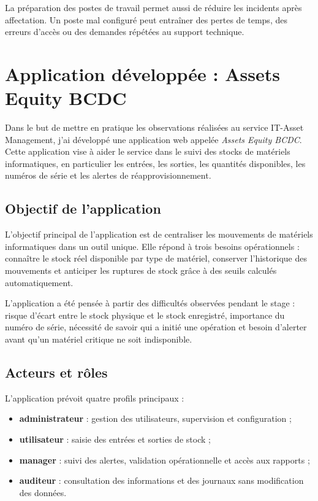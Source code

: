 \documentclass[12pt,a4paper]{report}
\begin{document}
La préparation des postes de travail permet aussi de réduire les incidents après affectation. Un poste mal configuré peut entraîner des pertes de temps, des erreurs d'accès ou des demandes répétées au support technique.

\section{Application développée : Assets Equity BCDC}

Dans le but de mettre en pratique les observations réalisées au service IT-Asset Management, j'ai développé une application web appelée \textit{Assets Equity BCDC}. Cette application vise à aider le service dans le suivi des stocks de matériels informatiques, en particulier les entrées, les sorties, les quantités disponibles, les numéros de série et les alertes de réapprovisionnement.

\subsection{Objectif de l'application}

L'objectif principal de l'application est de centraliser les mouvements de matériels informatiques dans un outil unique. Elle répond à trois besoins opérationnels : connaître le stock réel disponible par type de matériel, conserver l'historique des mouvements et anticiper les ruptures de stock grâce à des seuils calculés automatiquement.

L'application a été pensée à partir des difficultés observées pendant le stage : risque d'écart entre le stock physique et le stock enregistré, importance du numéro de série, nécessité de savoir qui a initié une opération et besoin d'alerter avant qu'un matériel critique ne soit indisponible.

\subsection{Acteurs et rôles}

L'application prévoit quatre profils principaux :

\begin{itemize}[label=--]
    \item \textbf{administrateur} : gestion des utilisateurs, supervision et configuration ;
    \item \textbf{utilisateur} : saisie des entrées et sorties de stock ;
    \item \textbf{manager} : suivi des alertes, validation opérationnelle et accès aux rapports ;
    \item \textbf{auditeur} : consultation des informations et des journaux sans modification des données.
\end{itemize}
\end{document}
